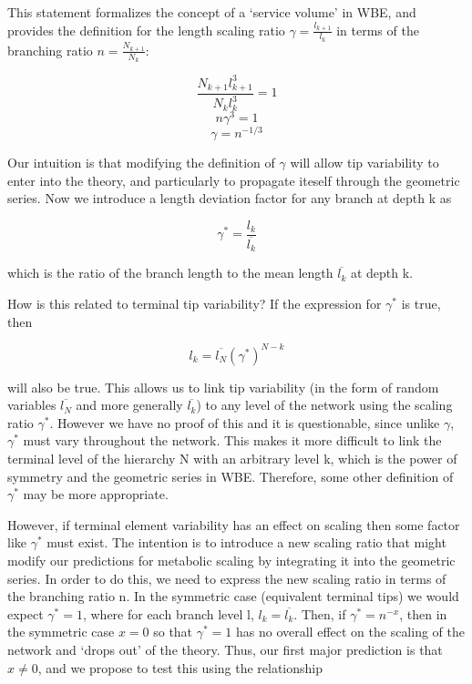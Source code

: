 \documentclass[]{article}
\begin{document}
This statement formalizes the concept of a `service volume' in WBE, and
provides the definition for the length scaling ratio
\(\gamma = \frac{l_{k+1}}{l_{k}}\) in terms of the branching ratio
\(n = \frac{N_{k+1}}{N_{k}}\):

\[\frac{N_{k+1}l_{k+1}^{3}}{N_{k}l_{k}^{3}} = 1\] \[n\gamma^{3} = 1\]
\[\gamma = n^{-1/3}\]

Our intuition is that modifying the definition of \(\gamma\) will allow
tip variability to enter into the theory, and particularly to propagate
iteself through the geometric series. Now we introduce a length
deviation factor for any branch at depth k as

\begin{equation}
\gamma^{*} = \frac{l_k}{\overline{l_{k}}}
\end{equation}

which is the ratio of the branch length to the mean length
\(\overline{l_{k}}\) at depth k.

How is this related to terminal tip variability? If the expression for
\(\gamma^{*}\) is true, then

\[l_{k} = \overline{l_{N}}(\gamma^{*})^{N-k}\]

will also be true. This allows us to link tip variability (in the form
of random variables \(\overline{l_{N}}\) and more generally
\(\overline{l_{k}}\)) to any level of the network using the scaling
ratio \(\gamma^{*}\). However we have no proof of this and it is
questionable, since unlike \(\gamma\), \(\gamma^{*}\) must vary
throughout the network. This makes it more difficult to link the
terminal level of the hierarchy N with an arbitrary level k, which is
the power of symmetry and the geometric series in WBE. Therefore, some
other definition of \(\gamma^{*}\) may be more appropriate.

However, if terminal element variability has an effect on scaling then
some factor like \(\gamma^{*}\) must exist. The intention is to
introduce a new scaling ratio that might modify our predictions for
metabolic scaling by integrating it into the geometric series. In order
to do this, we need to express the new scaling ratio in terms of the
branching ratio n. In the symmetric case (equivalent terminal tips) we
would expect \(\gamma^{*} = 1\), where for each branch level l,
\(l_{k} = \overline{l_{k}}\). Then, if \(\gamma^{*} = n^{-x}\), then in
the symmetric case \(x = 0\) so that \(\gamma^{*} = 1\) has no overall
effect on the scaling of the network and `drops out' of the theory.
Thus, our first major prediction is that \(x \neq 0\), and we propose to
test this using the relationship
\end{document}
